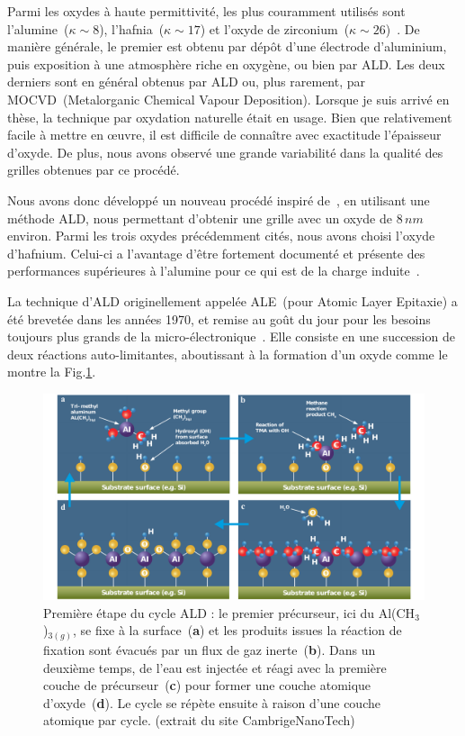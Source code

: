 Parmi les oxydes à haute permittivité, les plus couramment utilisés sont l'alumine~($\kappa \sim 8$), l'hafnia~($\kappa \sim 17$) et l'oxyde de zirconium~($\kappa \sim 26$)~\cite{Biercuk2003}. De manière générale, le premier est obtenu par dépôt d'une électrode d'aluminium, puis exposition à une atmosphère riche en oxygène, ou bien par ALD. Les deux derniers sont en général obtenus par ALD ou, plus rarement, par MOCVD~(Metalorganic Chemical Vapour Deposition). Lorsque je suis arrivé en thèse, la technique par oxydation naturelle était en usage. Bien que relativement facile à mettre en œuvre, il est difficile de connaître avec exactitude l'épaisseur d'oxyde. De plus, nous avons observé une grande variabilité dans la qualité des grilles obtenues par ce procédé.

Nous avons donc développé un nouveau procédé inspiré de~\cite{Biercuk2003}, en utilisant une méthode ALD, nous permettant d'obtenir une grille avec un oxyde de $8\,nm$ environ. Parmi les trois oxydes précédemment cités, nous avons choisi l'oxyde d'hafnium. Celui-ci a l'avantage d'être fortement documenté et présente des performances supérieures à l'alumine pour ce qui est de la charge induite~\cite{Biercuk2003}. 

La technique d'ALD originellement appelée ALE~(pour Atomic Layer Epitaxie) a été brevetée dans les années 1970, et remise au goût du jour pour les besoins toujours plus grands de la micro-électronique~\cite{Leskelae2003}. Elle consiste en une succession de deux réactions auto-limitantes, aboutissant à la formation d'un oxyde comme le montre la Fig.\ref{ALD}.

\begin{figure}
\centering \includegraphics[scale=0.45]{Fabrication/ALD/ALD.pdf}
\caption{Première étape du cycle ALD : le premier précurseur, ici du Al(CH$_3$)$_{3(g)}$, se fixe à la surface~(\textbf{a}) et les produits issues la réaction de fixation sont évacués par un flux de gaz inerte~(\textbf{b}). Dans un deuxième temps, de l'eau est injectée et réagi avec la première couche de précurseur~(\textbf{c}) pour former une couche atomique d'oxyde~(\textbf{d}). Le cycle se répète ensuite à raison d'une couche atomique par cycle. (extrait du site CambrigeNanoTech)}
\label{ALD}
\end{figure}


